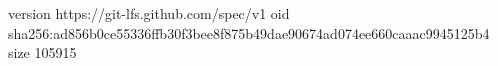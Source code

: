 version https://git-lfs.github.com/spec/v1
oid sha256:ad856b0ce55336ffb30f3bee8f875b49dae90674ad074ee660caaac9945125b4
size 105915
